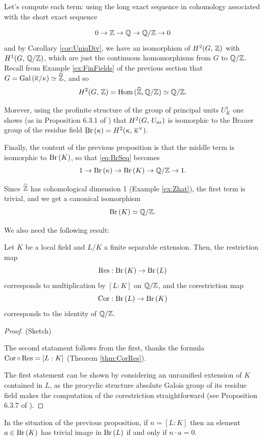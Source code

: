 \documentclass[a4paper, oneside]{memoir}
\begin{document}
Let's compute each term: using the long exact sequence in cohomology associated with the short exact sequence

\[
	0\to\mathbb{Z}\to\mathbb{Q}\to\mathbb{Q}/\mathbb{Z}\to 0
\]
and by Corollary \ref{cor:UniqDiv}, we have an isomorphism of $H^{2}( G, \, \mathbb{Z} )$ with $H^{1}( G, \, \mathbb{Q}/\mathbb{Z} )$, which are just the continuous homomorphisms from $G$ to $\mathbb{Q}/\mathbb{Z}$. Recall from Example
\ref{ex:FinFields} of the previous
section that $G=\operatorname{Gal}{(\overline{\kappa}/\kappa)}\simeq\widehat{\mathbb{Z}}$, and so
\[
	H^{2}( G, \, \mathbb{Z} )=\operatorname{Hom}{(\widehat{\mathbb{Z}},\mathbb{Q}/\mathbb{Z})}\simeq\mathbb{Q}/\mathbb{Z}.
\]

Morever, using the profinite structure of the group of principal units $U_K^1$ one shows (as in Proposition 6.3.1 of \cite{SzamuelyGille}) that $H^{2}( G, \, U_{\text{nr}} )$ is isomorphic to
the Brauer group of the residue field $\operatorname{Br}{(\kappa)}=H^{2}( \kappa, \, \overline{\kappa}^\times )$.

Finally, the content of the previous proposition is that the middle term is isomorphic to $\operatorname{Br}{(K)}$, so that \eqref{eq:BrSeq} becomes
\[
	1\to\operatorname{Br}{(\kappa)}\to\operatorname{Br}{(K)}\to\mathbb{Q}/\mathbb{Z}\to 1.
\]

Since $\widehat{\mathbb{Z}}$ has cohomological dimension 1 (Example \ref{ex:Zhat}), the first term is trivial, and we get a canonical isomorphism
\begin{equation}\label{eq:BrK}
	\operatorname{Br}{(K)}\simeq\mathbb{Q}/\mathbb{Z}.
\end{equation}

We also need the following result:

\begin{proposition}\label{prop:BrCorRes}
	Let $K$ be a local field and $L/K$ a finite separable extension. Then, the restriction map
	\[
		\operatorname{Res}: \operatorname{Br}{(K)}\to\operatorname{Br}{(L)}
	\]
	corresponds to multiplication by $[L:K]$ on $\mathbb{Q}/\mathbb{Z}$,
	and the corestriction map
	\[
		\operatorname{Cor}: \operatorname{Br}{(L)}\to\operatorname{Br}{(K)}
	\]
	corresponds to the identity of $\mathbb{Q}/\mathbb{Z}$.
\end{proposition}

\begin{proof}{(Sketch)}

	The second statament follows from the first, thanks the formula $\operatorname{Cor} \circ \operatorname{Res} = [L:K]$ (Theorem \ref{thm:CorRes}).

	The first statement can be shown by considering an unramified extension of $K$ contained in $L$, as the procyclic structure absolute Galois group of its residue field makes the computation of the corestriction
	straightforward (see Proposition 6.3.7 of \cite{SzamuelyGille}).
\end{proof}

\begin{corollary}\label{cor:BrRes}
	In the situation of the previous proposition, if $n=[L:K]$ then an element $a\in\operatorname{Br}{(K)}$ has trivial image in $\operatorname{Br}{(L)}$ if and only if $n\cdot a=0$.
\end{corollary}
\end{document}
